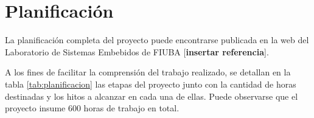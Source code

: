 %
%
%
%

\section{Planificación}
\label{sec:plan}

La planificación completa del proyecto puede encontrarse publicada en la web del Laboratorio de Sistemas Embebidos de FIUBA [\textbf{insertar referencia}].

A los fines de facilitar la comprensión del trabajo realizado, se detallan en la tabla \ref{tab:planificacion} las etapas del proyecto junto con la cantidad de horas destinadas y los hitos a alcanzar en cada una de ellas.  Puede observarse que el proyecto insume 600 horas de trabajo en total.

